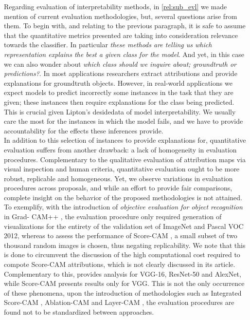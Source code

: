 \noindent Regarding evaluation of interpretability methods, in \autoref{rel:sub_evl} we made mention 
of current evaluation methodologies, but, several questions arise from them. To begin with, and                                                                                                          
relating to the previous paragraph, it is safe to assume that the quantitative metrics presented 
are taking into consideration relevance towards the classifier. In particular \emph{these 
methods are telling us which representation explains the best a given class for the model}. 
And yet, in this case we can also wonder about \emph{which class should we inquire about; 
groundtruth or predictions?}. In most applications researchers extract attributions and provide 
explanations for groundtruth objects. However, in real-world applications we expect models to 
predict incorrectly some instances in the task that they are given; these instances then require 
explanations for the class being predicted. This is crucial given Lipton's desidedata of model 
interpretability. We usually care the most for the instances in which the model fails, and we have 
to provide accountability for the effects these inferences provide. \\

\noindent In addition to this selection of instances to provide explanations for, quantitative 
evaluation suffers from another drawback: a lack of homogeneity in evaluation procedures. 
Complementary to the qualitative evaluation of attribution maps via visual inspection and human 
criteria, quantitative evaluation ought to be more robust, replicable and homogeneous. Yet, we 
observe variations in evaluation procedures across proposals, and while an effort to provide fair 
comparisons, complete insight on the behavior of the proposed methodologies is not attained. 
To exemplify, with the introduction of \emph{objective evaluation for object recognition} in Grad-
CAM++ \autocite{chattopadhay2018grad}, the evaluation procedure only required generation of 
visualizations for the entirety of the validation set of ImageNet and Pascal VOC 2012, whereas 
to assess the performance of Score-CAM \autocite{wang2020score}, a small subset of two thousand 
random images is chosen, thus negating replicability. We note that this is done to circumvent the 
discussion of the high computational cost required to compote Score-CAM attributions, which is  
not clearly discussed in its article. Complementary to this, 
\cite{chattopadhay2018grad} provides analysis for VGG-16, ResNet-50 and AlexNet, while Score-CAM 
presents results only for VGG.  This is not the only occurrence of these phenomena, upon the 
introduction of methodologies such as Integrated Score-CAM \autocite{naidu2020cam}, Ablation-CAM
\autocite{ablationcam} and Layer-CAM \autocite{jiang2021layercam}, the evaluation procedures are 
found not to be standardized between approaches.\\

